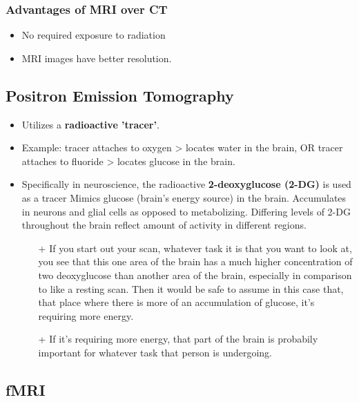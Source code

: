 \documentclass[12pt,a4paper]{article}
\begin{document}
	\subsubsection{Advantages of MRI over CT}
	
	\begin{itemize}
		\item No required exposure to radiation 
		\item MRI images have better resolution. 
	\end{itemize}
	
	\subsection{Positron Emission Tomography}
	
	\begin{itemize}
		\item Utilizes a \textbf{radioactive 'tracer'}.
		\item Example: tracer attaches to oxygen > locates water in the brain, OR tracer attaches to fluoride > locates glucose in the brain. 
		\item Specifically in neuroscience, the radioactive \textbf{2-deoxyglucose (2-DG)} is used as a tracer
		\subitem Mimics glucose (brain's energy source) in the brain. 
		\subitem Accumulates in neurons and glial cells as opposed to metabolizing. 
		\subitem Differing levels of 2-DG throughout the brain reflect amount of activity in different regions. 
		\begin{itemize}
			\item[+] If you start out your scan, whatever task it is that you want to look at, you see that this one area of the brain has a much higher concentration of two deoxyglucose than another area of the brain, especially in comparison to like a resting scan. Then it would be safe to assume in this case that, that place where there is more of an accumulation of glucose, it's requiring more energy.
			\item[+] If it's requiring more energy, that part of the brain is probabily important for whatever task that person is undergoing.  
		\end{itemize} 
	\end{itemize}
	
	\subsection{fMRI}
	
\end{document}

